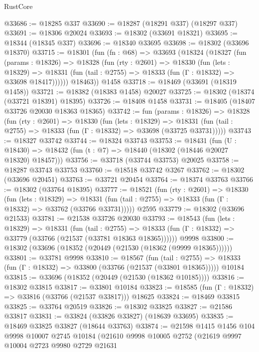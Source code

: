 \begin{lexlean}{RustCore}
\begin{coremodule}
@33686 := @18285 @337
@33690 := @18287 (@18291 @337) (@18297 @337)
@33691 := @18306 @20024
@33693 := @18302 (@33691 @18321)
@33695 := @18344 (@18345 @337)
@33696 := @18340 @33695
@33698 := @18302 (@33696 @18370)
@33715 := @18301
    (fun (fn : @68) =>
    @33693
      (@18324
        (@18327
          (fun (params : @18326) =>
          @18328
            (fun (rty : @2601) =>
            @18330
              (fun (lets : @18329) =>
              @18331 (fun (tail : @2755) => @18333 (fun (Γ : @18332) => @33698 @18417))))))
        @18463))
    @1458
@33718 := @18469 (@33691 (@18319 @1458))
@33721 := @18382 (@18383 @1458) @20027
@33725 := @18302 (@18374 (@33721 @18391) @18395)
@33726 := @18408 @1458
@33731 := @18405 (@18407 @33726 @20030 @18363 @18365)
@33742 := fun (params : @18326) =>
  @18328
    (fun (rty : @2601) =>
    @18330
      (fun (lets : @18329) =>
      @18331 (fun (tail : @2755) => @18333 (fun (Γ : @18332) => @33698 (@33725 @33731)))))
@33743 := @18327 @33742
@33744 := @18324 @33743
@33753 := @18431
    (fun (U : @18430) => @18432 (fun (t : @7) => @18440 (@18302 (@18446 @20027 @18320) @18457)))
@33756 := @33718 (@33744 @33753) @20025
@33758 := @18287 @33743 @33753
@33760 := @18518 @33742 @3267
@33762 := @18302 (@33696 @20451)
@33763 := @33721 @20454
@33764 := @18374 @33763
@33766 := @18302 (@33764 @18395)
@33777 := @18521
    (fun (rty : @2601) =>
    @18330
      (fun (lets : @18329) =>
      @18331 (fun (tail : @2755) => @18333 (fun (Γ : @18332) => @33762 (@33766 @33731)))))
    @2595
@33779 := @18302 (@33696 @21533)
@33781 := @21538 @33726 @20030
@33793 := @18543
    (fun (lets : @18329) =>
    @18331
      (fun (tail : @2755) =>
      @18333 (fun (Γ : @18332) => @33779 (@33766 (@21537 (@33781 @18363 @18365))))))
    @9998
@33800 := @18302 (@33696 (@18352 (@20449 (@21530 (@18362 (@9999 @18365))))))
@33801 := @33781 @9998
@33810 := @18567
    (fun (tail : @2755) => @18333 (fun (Γ : @18332) => @33800 (@33766 (@21537 (@33801 @18365)))))
    @10184
@33815 := @33696 (@18352 (@20449 (@21530 (@18362 @10185))))
@33816 := @18302 @33815
@33817 := @33801 @10184
@33823 := @18585 (fun (Γ : @18332) => @33816 (@33766 (@21537 @33817))) @18625
@33824 := @18469 @33815
@33825 := @33764 @20519
@33826 := @18302 @33825
@33827 := @21586 @33817
@33831 := @33824 (@33826 @33827) (@18639 @33695)
@33835 := @18469 @33825 @33827 (@18644 @33763)
@33874 := @21598
    @1415
    @1456
    @104
    @9998
    @10007
    @2745
    @10184
    (@21610
      @9998
      @10005
      @2752
      (@21619
        @9997
        @10004
        @2723
        @9980
        @2729
        @21631

\end{coremodule}
\end{lexlean}
